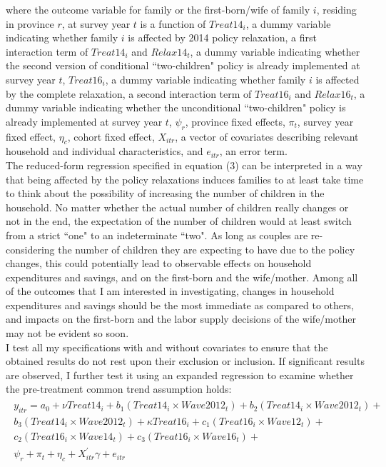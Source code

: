 \documentclass[12pt]{extarticle}
\begin{document}
where the outcome variable for family or the first-born/wife of family $i$, residing in province $r$, at survey year $t$ is a function of ${Treat14}_i$, a dummy variable indicating whether family $i$ is affected by 2014 policy relaxation, a first interaction term of ${Treat14}_i$ and ${Relax14}_t$, a dummy variable indicating whether the second version of conditional ``two-children" policy is already implemented at survey year $t$, ${Treat16}_i$, a dummy variable indicating whether family $i$ is affected by the complete relaxation, a second interaction term of ${Treat16}_i$ and ${Relax16}_t$, a dummy variable indicating whether the unconditional ``two-children" policy is already implemented at survey year $t$, $\psi_r$, province fixed effects, $\pi_t$, survey year fixed effect, $\eta_c$, cohort fixed effect, $X_{itr}$, a vector of covariates describing relevant household and individual characteristics, and $e_{itr}$, an error term. \\
\indent The reduced-form regression specified in equation (3) can be interpreted in a way that being affected by the policy relaxations induces families to at least take time to think about the possibility of increasing the number of children in the household. No matter whether the actual number of children really changes or not in the end, the expectation of the number of children would at least switch from a strict ``one" to an indeterminate ``two". As long as couples are re-considering the number of children they are expecting to have due to the policy changes, this could potentially lead to observable effects on household expenditures and savings, and  on the first-born and the wife/mother. Among all of the outcomes that I am interested in investigating, changes in household expenditures and savings should be the most immediate as compared to others, and impacts on the first-born and the labor supply decisions of the wife/mother may not be evident so soon. \\
\indent I test all my specifications with and without covariates to ensure that the obtained results do not rest upon their exclusion or inclusion. If significant results are observed, I further test it using an expanded regression to examine whether the pre-treatment common trend assumption holds: \\
\begin{align}
\begin{split}
y_{itr} = a_{0}+\nu{Treat14}_i+b_{1}({Treat14}_i \times {Wave2012}_t) +b_{2}({Treat14}_i \times {Wave2012}_t)+ \\ b_{3}({Treat14}_i \times {Wave2012}_t)+\kappa{Treat16}_i+c_{1}({Treat16}_i \times {Wave12}_t)+ \\ c_{2}({Treat16}_i \times {Wave14}_t)+c_{3}({Treat16}_i \times {Wave16}_t)+ \\ \psi_r+\pi_t+\eta_c+X_{itr}^{'}\gamma+e_{itr}
\end{split}
\end{align}
\end{document}
